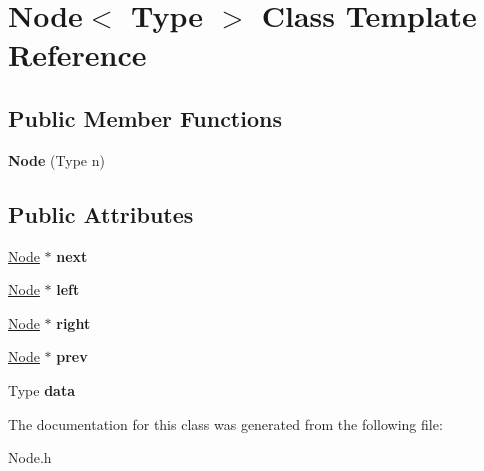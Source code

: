 \hypertarget{class_node}{}\section{Node$<$ Type $>$ Class Template Reference}
\label{class_node}
\subsection*{Public Member Functions}
\begin{DoxyCompactItemize}
\item 
\mbox{\label{class_node_ab71076020d4a5e98653d54ac81610cd8}} 
{\bfseries Node} (Type n)
\end{DoxyCompactItemize}
\subsection*{Public Attributes}
\begin{DoxyCompactItemize}
\item 
\mbox{\label{class_node_a0659c1cb99599bedd163d63603fe0bb7}} 
\mbox{\hyperlink{class_node}{Node}} $\ast$ {\bfseries next}
\item 
\mbox{\label{class_node_abb08a8b3137dd8fc8874348a439e01b4}} 
\mbox{\hyperlink{class_node}{Node}} $\ast$ {\bfseries left}
\item 
\mbox{\label{class_node_a34452c0684d3cb1590406ad201b43e65}} 
\mbox{\hyperlink{class_node}{Node}} $\ast$ {\bfseries right}
\item 
\mbox{\label{class_node_af46472827dd148b7e22fc863d2a95aa5}} 
\mbox{\hyperlink{class_node}{Node}} $\ast$ {\bfseries prev}
\item 
\mbox{\label{class_node_a9c844a942f0c368060d663bfa7418cbe}} 
Type {\bfseries data}
\end{DoxyCompactItemize}


The documentation for this class was generated from the following file\+:\begin{DoxyCompactItemize}
\item 
Node.\+h\end{DoxyCompactItemize}

